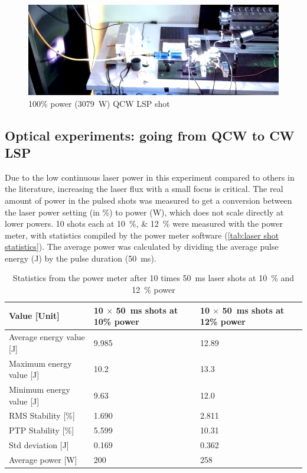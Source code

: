             \begin{figure}[!ht]
                \centering
                \includegraphics[width=\textwidth]{assets/4 experiments/holy jesus look at this.png}
                \caption{100\% power (\qty{3079}{W}) QCW LSP shot}
                \label{fig: big flash}
            \end{figure}

        \subsection{Optical experiments: going from QCW to CW LSP}

            Due to the low continuous laser power in this experiment compared to others in the literature, increasing the laser flux with a small focus is critical. The real amount of power in the pulsed shots was measured to get a conversion between the laser power setting (in \%) to power (W), which does not scale directly at lower powers. 10 shots each at \qtylist{10; 12}{\%} were measured with the power meter, with statistics compiled by the power meter software (\autoref{tab:laser shot statistics}). The average power was calculated by dividing the average pulse energy (J) by the pulse duration (\qty{50}{ms}).

            \begin{table}[!ht]
                \caption{Statistics from the power meter after 10 times \qty{50}{ms} laser shots at \qty{10}{\%} and \qty{12}{\%} power}
                \label{tab:laser shot statistics}
                \begin{tabularx}{\textwidth}{@{}lX<{\raggedright}X<{\raggedright}@{}}
                \toprule
                Value {[}Unit{]} & 10 $\times$ \qty{50}{ms} shots at 10\% power & 10 $\times$ \qty{50}{ms} shots at 12\% power \\ \midrule
                Average energy value {[}J{]}  & 9.985 & 12.89 \\
                Maximum energy value {[}J{]}  & 10.2  & 13.3  \\
                Minimum energy value {[}J{]}  & 9.63  & 12.0  \\
                RMS Stability {[}\%{]} & 1.690 & 2.811 \\
                PTP Stability {[}\%{]} & 5.599 & 10.31 \\
                Std deviation {[}J{]}  & 0.169 & 0.362 \\
                Average power {[}W{]}  & 200 & 258  \\ 
                \bottomrule
                \end{tabularx}
            \end{table}
            
